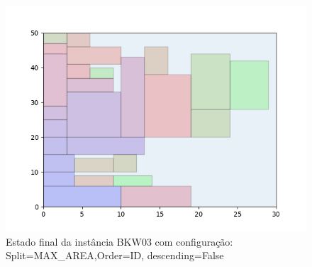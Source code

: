 \begin{figure}[H]
    \centering
    \caption[]{Estado final da instância BKW03 com configuração: Split=MAX_AREA,Order=ID, descending=False}
    \label{fig:bkw03-max_area-id-false}
    \includegraphics[scale=0.5]{output/figures/bkw/bkw03/max_area/id/false/00}
\end{figure}